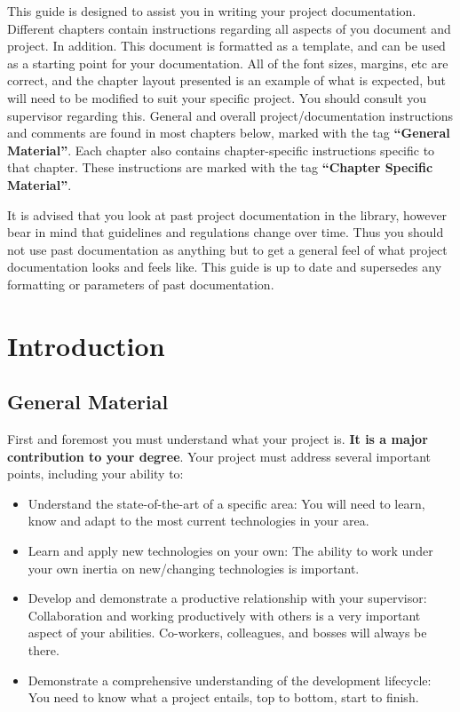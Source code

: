 \documentclass{report}[a4paper,12pt,onecolumn]
\begin{document}
This guide is designed to assist you in writing your project documentation. Different chapters contain instructions regarding all aspects of you document and project. In addition. This document is formatted as a template, and can be used as a starting point for your documentation. All of the font sizes, margins, etc are correct, and the chapter layout presented is an example of what is expected, but will need to be modified to suit your specific project. You should consult you supervisor regarding this. General and overall project/documentation instructions and comments are found in most chapters below, marked with the tag \textbf{``General Material''}. Each chapter also contains chapter-specific instructions specific to that chapter. These instructions are marked with the tag \textbf{``Chapter Specific Material''}.

It is advised that you look at past project documentation in the library, however bear in mind that guidelines and regulations change over time. Thus you should not use past documentation as anything but to get a general feel of what project documentation looks and feels like. This guide is up to date and supersedes any formatting or parameters of past documentation.

\newpage

\chapter{Introduction}

\section{General Material}

First and foremost you must understand what your project is. \textbf{It is a major contribution to your degree}. Your project must address several important points, including your ability to:
\begin{itemize}
    \item Understand the state-of-the-art of a specific area: You will need to learn, know and adapt to the most current technologies in your area.
    \item Learn and apply new technologies on your own: The ability to work under your own inertia on new/changing technologies is important.
    \item Develop and demonstrate a productive relationship with your supervisor: Collaboration and working productively with others is a very important aspect of your abilities. Co-workers, colleagues, and bosses will always be there.
    \item Demonstrate a comprehensive understanding of the development lifecycle: You need to know what a project entails, top to bottom, start to finish.
\end{itemize}
\end{document}
